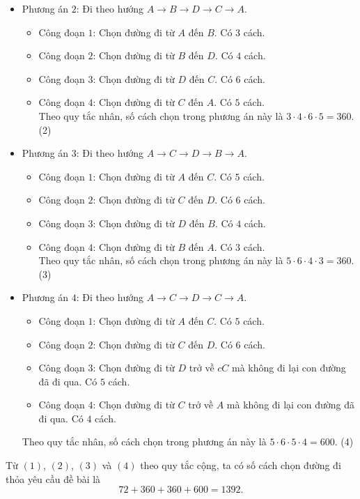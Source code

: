\begin{vd}
{\begin{itemize}
\begin{itemize}
			\end{itemize}
		\item Phương án $2$: 		
 Đi theo hướng $A\longrightarrow B\longrightarrow D\longrightarrow C\longrightarrow A$.
 \begin{itemize}
	\item Công đoạn $1$: Chọn đường đi từ $A$ đến $B$. Có $3$ cách.
\item Công đoạn $2$: Chọn đường đi từ $B$ đến $D$. Có $4$ cách.
\item Công đoạn $3$: Chọn đường đi từ $D$ đến $C$. Có $6$ cách.
\item Công đoạn $4$: Chọn đường đi từ $C$ đến $A$. Có $5$ cách.\\
Theo quy tắc nhân, số cách chọn trong phương án này là $3\cdot 4 \cdot 6 \cdot 5= 360$. \qquad (2)
\end{itemize}
\item Phương án $3$: 		
Đi theo hướng $A\longrightarrow C\longrightarrow D\longrightarrow B\longrightarrow A$.
 \begin{itemize}
\item Công đoạn $1$: Chọn đường đi từ $A$ đến $C$. Có $5$ cách.
\item Công đoạn $2$: Chọn đường đi từ $C$ đến $D$. Có $6$ cách.
\item Công đoạn $3$: Chọn đường đi từ $D$ đến $B$. Có $4$ cách.
\item Công đoạn $4$: Chọn đường đi từ $B$ đến $A$. Có $3$ cách.\\
Theo quy tắc nhân, số cách chọn trong phương án này là $5\cdot 6 \cdot 4 \cdot 3=360$. \qquad (3)
\end{itemize}
\item Phương án $4$: 		
Đi theo hướng $A\longrightarrow C\longrightarrow D\longrightarrow C \longrightarrow A$.
\begin{itemize}
\item Công đoạn $1$: Chọn đường đi từ $A$ đến $C$. Có $5$ cách.
\item Công đoạn $2$: Chọn đường đi từ $C$ đến $D$. Có $6$ cách.
\item Công đoạn $3$: Chọn đường đi từ $D$ trở về $cC$ mà không đi lại con đường đã đi qua. Có $5$ cách.
\item Công đoạn $4$: Chọn đường đi từ $C$ trở về $A$ mà không đi lại con đường đã đi qua. Có $4$ cách.
\end{itemize}
Theo quy tắc nhân, số cách chọn trong phương án này là $5\cdot 6 \cdot 5 \cdot 4= 600$. \qquad (4)
\end{itemize}
Từ $(1)$, $(2)$, $(3)$ và $(4)$ theo quy tắc cộng, ta có số cách chọn đường đi thỏa yêu cầu đề bài là $$72+360+360+600=1392.$$
	}
\end{vd}
